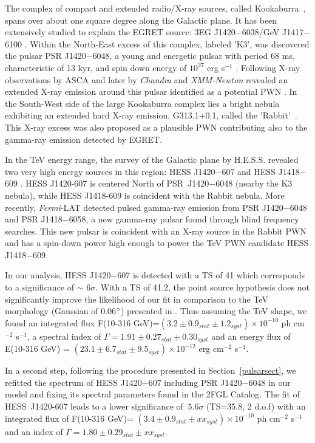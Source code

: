 The complex of compact and extended radio/X-ray sources, called Kookaburra~\citep{1999ApJ...515..712R}, spans over about one square degree along the Galactic plane. It has been extensively studied to explain the EGRET source: 3EG J1420$-$6038/GeV J1417$-$6100 \citep{1999ApJS..123...79H}. Within the North-East excess of this complex, labeled 'K3',  was discovered the pulsar PSR J1420$-$6048, a young and energetic pulsar with period 68 ms, characteristic of 13 kyr, and spin down energy of $10^{37}$ erg s$^{-1}$ \citep{2001ApJ...552L..45D}. Following X-ray observations by ASCA and later by \emph{Chandra} and \emph{XMM-Newton} revealed an extended X-ray emission around this pulsar identified as a potential PWN \citep{2001ApJ...561L.187R,2005ApJ...627..904N}. In the South-West side of the large Kookaburra complex lies a bright nebula exhibiting an extended hard X-ray emission, G313.1+0.1, called the 'Rabbit'~\citep{1999ApJ...515..712R}. This X-ray excess was also proposed as a plausible PWN contributing also to the gamma-ray emission detected by EGRET.

In the TeV energy range, the survey of the Galactic plane by H.E.S.S. revealed two very high energy sources in this region: HESS J1420$-$607 and HESS J1418$-$609 \citep{2006AA...456..245A}. HESS J1420-607 is centered North of PSR~J1420$-$6048 (nearby the K3 nebula), while HESS J1418-609 is coincident with the Rabbit nebula. More recently, \emph{Fermi}-LAT detected  pulsed gamma-ray emission from PSR J1420$-$6048 and PSR J1418$-$6058, a new gamma-ray pulsar found through blind frequency searches. This new pulsar is coincident with an X-ray source in the Rabbit PWN and has a spin-down power high enough to power the TeV PWN candidate HESS J1418$-$609. 

In our analysis, HESS J1420$-$607 is detected with a TS of 41 which corresponds to a significance of $\sim$ 6$\sigma$. With a TS of 41.2, the point source hypothesis does not significantly improve the likelihood of our fit in comparison to the TeV morphology (Gaussian of 0.06$\mbox{$^\circ$}$) presented in \citep{2006AA...456..245A}. Thus assuming the TeV shape, we found an integrated flux F(10-316 GeV)=$(3.2 \pm 0.9_{stat} \pm 1.2_{syst}) \times 10^{-10}$ ph cm$^{-2}$ s$^{-1}$, a spectral index of $\Gamma = 1.91 \pm 0.27_{stat} \pm 0.30_{syst}$ and an energy flux of E(10-316 GeV) = $(23.1 \pm 6.7_{stat} \pm 9.5_{syst}) \times 10^{-12}$ erg cm$^{-2}$ s$^{-1}$.

In a second step, following the procedure presented in Section~\ref{pulsarsect}, we refitted the spectrum of HESS J1420$-$607 including PSR J1420$-$6048 in our model and fixing its spectral parameters found in the 2FGL Catalog. The fit of HESS~J1420-607 leads to a lower significance of $~5.6 \sigma$ (TS=35.8, 2 d.o.f) with an integrated flux of F(10-316 GeV)= $(3.4 \pm 0.9_{stat} \pm xx_{syst}) \times 10^{-10}$ ph cm$^{-2}$ s$^{-1}$ and an index of $\Gamma = 1.80 \pm 0.29_{stat} \pm xx_{syst}$.  


